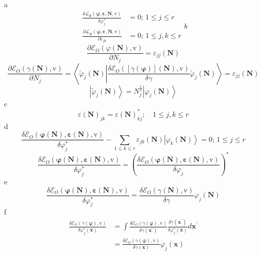 \documentclass[aps,preprint]{revtex4}%
\begin{document}
a%
\begin{subequations}
\begin{align*}
\frac{\delta\mathcal{L}_{\mathbf{\varphi}}\left(  \mathbf{\varphi
},\mathbf{\varepsilon,N,}\mathrm{v}\right)  }{\delta\varphi_{j}^{\ast}}  &
=0;\,1\leq j\leq r\\
\frac{\partial\mathcal{L}_{\mathbf{\varphi}}\left(  \mathbf{\varphi
},\mathbf{\varepsilon,N,}\mathrm{v}\right)  }{\partial\varepsilon_{jk}}  &
=0;\,1\leq j,k\leq r
\end{align*}
b%
\end{subequations}
\[
\frac{\partial\mathcal{E}_{O}\left(  \varphi\mathbf{\left(  \mathbf{N}\right)
},\mathrm{v}\right)  }{\partial N_{j}}=\varepsilon_{jj}\left(  \mathbf{N}%
\right)
\]%
\[
\frac{\partial\mathcal{E}_{O}\left(  \gamma\mathbf{\left(  \mathbf{N}\right)
},\mathrm{v}\right)  }{\partial N_{j}}=\left\langle \tilde{\varphi}_{j}\left(
\mathbf{N}\right)  \left\vert \frac{\delta\mathcal{E}_{O}\left(  \left[
\gamma\left(  \mathbf{\varphi}\right)  \right]  \mathbf{\left(  \mathbf{N}%
\right)  ,}\mathrm{v}\right)  }{\delta\gamma}\right.  \tilde{\varphi}%
_{j}\left(  \mathbf{N}\right)  \right\rangle =\varepsilon_{jj}\left(
\mathbf{N}\right)
\]%
\[
\left\vert \tilde{\varphi}_{j}\left(  \mathbf{N}\right)  \right\rangle
=N_{j}^{\frac{1}{2}}\left\vert \varphi_{j}\left(  \mathbf{N}\right)
\right\rangle
\]
c%
\[
\varepsilon\left(  \mathbf{N}\right)  _{jk}=\varepsilon\left(  \mathbf{N}%
\right)  _{kj}^{\ast};\quad1\leq j,k\leq r
\]
d%
\[
\frac{\delta\mathcal{E}_{O}\left(  \mathbf{\varphi}\left(  \mathbf{N}\right)
,\mathbf{\varepsilon}\left(  \mathbf{N}\right)  ,\mathrm{v}\right)  }%
{\delta\varphi_{j}^{\ast}}-\sum_{1\leq k\leq r}\varepsilon_{jk}\left(
\mathbf{N}\right)  \left\vert \varphi_{k}\left(  \mathbf{N}\right)
\right\rangle =0;\,1\leq j\leq r
\]%
\[
\frac{\delta\mathcal{E}_{O}\left(  \mathbf{\varphi}\left(  \mathbf{N}\right)
,\mathbf{\varepsilon}\left(  \mathbf{N}\right)  ,\mathrm{v}\right)  }%
{\delta\varphi_{j}^{\ast}}=\left(  \frac{\delta\mathcal{E}_{O}\left(
\mathbf{\varphi}\left(  \mathbf{N}\right)  ,\mathbf{\varepsilon}\left(
\mathbf{N}\right)  ,\mathrm{v}\right)  }{\delta\varphi_{j}}\right)  ^{\ast}%
\]
e%
\[
\frac{\delta\mathcal{E}_{O}\left(  \mathbf{\varphi}\left(  \mathbf{N}\right)
,\mathbf{\varepsilon}\left(  \mathbf{N}\right)  ,\mathrm{v}\right)  }%
{\delta\varphi_{j}^{\ast}}=\frac{\delta\mathcal{E}_{O}\left(  \gamma\left(
\mathbf{N}\right)  \mathbf{,}\mathrm{v}\right)  }{\delta\gamma}\varphi
_{j}\left(  \mathbf{N}\right)
\]
f%
\begin{align*}
\frac{\delta\mathcal{E}_{O}\left(  \gamma\left(  \mathbf{\varphi}\right)
\mathbf{,}\mathrm{v}\right)  }{\delta\varphi_{j}^{\ast}\left(  \mathbf{x}%
\right)  }  &  =\int\frac{\delta\mathcal{E}_{O}\left(  \gamma\left(
\mathbf{\varphi}\right)  \mathbf{,}\mathrm{v}\right)  }{\delta\gamma\left(
\mathbf{x}^{\prime}\right)  }\frac{\delta\gamma\left(  \mathbf{x}^{\prime
}\right)  }{\delta\varphi_{j}^{\ast}\left(  \mathbf{x}\right)  }%
d\mathbf{x}^{\prime}\\
&  =\frac{\delta\mathcal{E}_{O}\left(  \gamma\left(  \mathbf{\varphi}\right)
\mathbf{,}\mathrm{v}\right)  }{\delta\gamma\left(  \mathbf{x}\right)  }%
\varphi_{j}\left(  \mathbf{x}\right)
\end{align*}%
\end{document}
